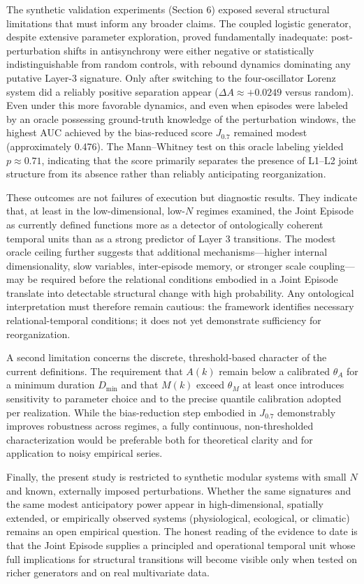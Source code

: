 The synthetic validation experiments (Section 6) exposed several structural limitations that must inform any broader claims. The coupled logistic generator, despite extensive parameter exploration, proved fundamentally inadequate: post-perturbation shifts in antisynchrony were either negative or statistically indistinguishable from random controls, with rebound dynamics dominating any putative Layer-3 signature. Only after switching to the four-oscillator Lorenz system did a reliably positive separation appear ($\Delta A \approx +0.0249$ versus random). Even under this more favorable dynamics, and even when episodes were labeled by an oracle possessing ground-truth knowledge of the perturbation windows, the highest AUC achieved by the bias-reduced score $J_{0.7}$ remained modest (approximately 0.476). The Mann--Whitney test on this oracle labeling yielded $p \approx 0.71$, indicating that the score primarily separates the presence of L1--L2 joint structure from its absence rather than reliably anticipating reorganization.

These outcomes are not failures of execution but diagnostic results. They indicate that, at least in the low-dimensional, low-$N$ regimes examined, the Joint Episode as currently defined functions more as a detector of ontologically coherent temporal units than as a strong predictor of Layer 3 transitions. The modest oracle ceiling further suggests that additional mechanisms---higher internal dimensionality, slow variables, inter-episode memory, or stronger scale coupling---may be required before the relational conditions embodied in a Joint Episode translate into detectable structural change with high probability. Any ontological interpretation must therefore remain cautious: the framework identifies necessary relational-temporal conditions; it does not yet demonstrate sufficiency for reorganization.

A second limitation concerns the discrete, threshold-based character of the current definitions. The requirement that $A(k)$ remain below a calibrated $\theta_A$ for a minimum duration $D_{\min}$ and that $M(k)$ exceed $\theta_M$ at least once introduces sensitivity to parameter choice and to the precise quantile calibration adopted per realization. While the bias-reduction step embodied in $J_{0.7}$ demonstrably improves robustness across regimes, a fully continuous, non-thresholded characterization would be preferable both for theoretical clarity and for application to noisy empirical series.

Finally, the present study is restricted to synthetic modular systems with small $N$ and known, externally imposed perturbations. Whether the same signatures and the same modest anticipatory power appear in high-dimensional, spatially extended, or empirically observed systems (physiological, ecological, or climatic) remains an open empirical question. The honest reading of the evidence to date is that the Joint Episode supplies a principled and operational temporal unit whose full implications for structural transitions will become visible only when tested on richer generators and on real multivariate data.

